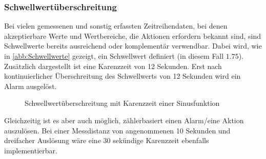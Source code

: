 \subsubsection{Schwellwertüberschreitung}\label{chap:schwellwert}
Bei vielen gemessenen und sonstig erfassten Zeitreihendaten, bei denen akzeptierbare Werte und Wertbereiche, die Aktionen erfordern bekannt sind, sind Schwellwerte bereits ausreichend oder komplementär verwendbar. Dabei wird, wie in \autoref{abb:Schwellwerte} gezeigt, ein Schwellwert definiert (in diesem Fall $1.75$). Zusätzlich dargestellt ist eine Karenzzeit von 12 Sekunden. Erst nach kontinuierlicher Überschreitung des Schwellwerts von 12 Sekunden wird ein Alarm ausgelöst. 
\begin{figure}[H]
\centering
{}
\caption{Schwellwertüberschreitung mit Karenzzeit einer Sinusfunktion}
\label{abb:Schwellwerte}
\end{figure}
Gleichzeitig ist es aber auch möglich, zählerbasiert einen Alarm/eine Aktion auszulösen. Bei einer Messdistanz von angenommenen 10 Sekunden und dreifacher Auslösung wäre eine 30 sekündige Karenzzeit ebenfalls implementierbar.

